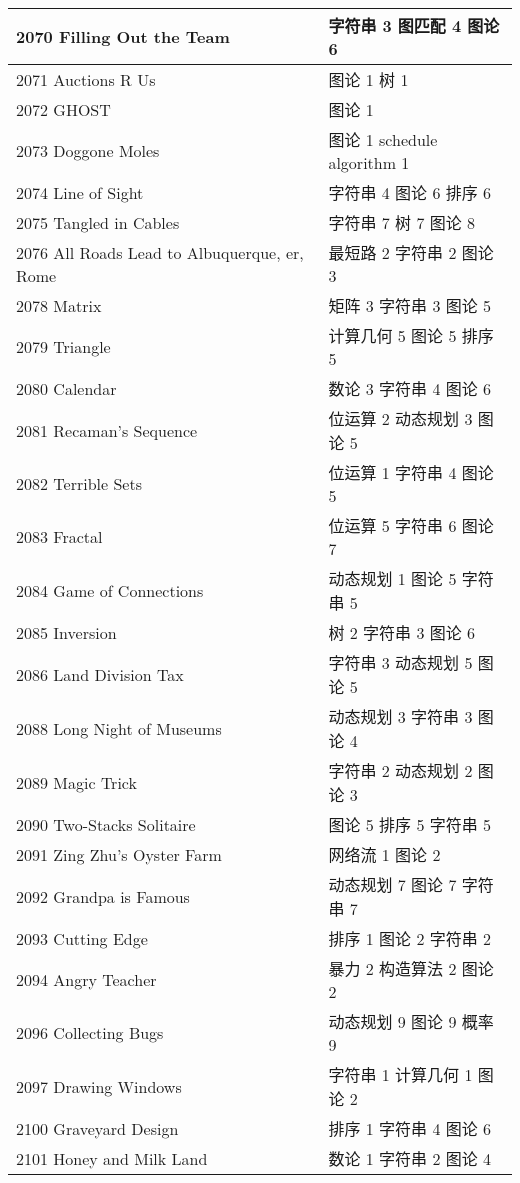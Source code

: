 \begin{longtable}{| p{} | p{} |}
 2070 Filling Out the Team  & 字符串 3 图匹配 4 图论 6 \\ \hline
 2071 Auctions R Us  & 图论 1 树 1 \\ \hline
 2072 GHOST  & 图论 1 \\ \hline
 2073 Doggone Moles  & 图论 1 schedule algorithm 1 \\ \hline
 2074 Line of Sight  & 字符串 4 图论 6 排序 6 \\ \hline
 2075 Tangled in Cables  & 字符串 7 树 7 图论 8 \\ \hline
 2076 All Roads Lead to Albuquerque, er, Rome  & 最短路 2 字符串 2 图论 3 \\ \hline
 2078 Matrix  & 矩阵 3 字符串 3 图论 5 \\ \hline
 2079 Triangle  & 计算几何 5 图论 5 排序 5 \\ \hline
 2080 Calendar  & 数论 3 字符串 4 图论 6 \\ \hline
 2081 Recaman's Sequence  & 位运算 2 动态规划 3 图论 5 \\ \hline
 2082 Terrible Sets  & 位运算 1 字符串 4 图论 5 \\ \hline
 2083 Fractal  & 位运算 5 字符串 6 图论 7 \\ \hline
 2084 Game of Connections  & 动态规划 1 图论 5 字符串 5 \\ \hline
 2085 Inversion  & 树 2 字符串 3 图论 6 \\ \hline
 2086 Land Division Tax  & 字符串 3 动态规划 5 图论 5 \\ \hline
 2088 Long Night of Museums  & 动态规划 3 字符串 3 图论 4 \\ \hline
 2089 Magic Trick  & 字符串 2 动态规划 2 图论 3 \\ \hline
 2090 Two-Stacks Solitaire  & 图论 5 排序 5 字符串 5 \\ \hline
 2091 Zing Zhu's Oyster Farm  & 网络流 1 图论 2 \\ \hline
 2092 Grandpa is Famous  & 动态规划 7 图论 7 字符串 7 \\ \hline
 2093 Cutting Edge  & 排序 1 图论 2 字符串 2 \\ \hline
 2094 Angry Teacher  & 暴力 2 构造算法 2 图论 2 \\ \hline
 2096 Collecting Bugs  & 动态规划 9 图论 9 概率 9 \\ \hline
 2097 Drawing Windows  & 字符串 1 计算几何 1 图论 2 \\ \hline
 2100 Graveyard Design  & 排序 1 字符串 4 图论 6 \\ \hline
 2101 Honey and Milk Land  & 数论 1 字符串 2 图论 4 \\ \hline

\end{longtable}
